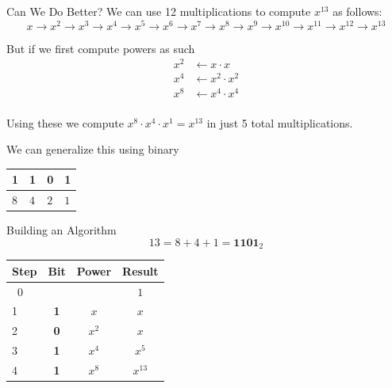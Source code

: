 \documentclass[aspectratio=169]{beamer}
\begin{document}
\begin{frame}{Can We Do Better?}
    We can use 12 multiplications to compute $x^{13}$ as follows: 
    \[
    x \to x^2 \to x^3 \to x^4 \to x^5 \to x^6 \to x^7 \to x^8 \to x^9 \to x^{10} \to x^{11} \to x^{12} \to x^{13}
    \]
    
    \pause
    
    But if we first compute powers as such
    \begin{align*}
        x^2 &\gets x \cdot x \\
        x^4 &\gets x^2 \cdot x^2 \\ 
        x^8 &\gets x^4 \cdot x^4 \\
    \end{align*}
    
    \pause
    
    Using these we compute $x^8 \cdot x^4 \cdot x^1 = x^{13}$ in just 5 total multiplications.
    
    \pause
    
    We can generalize this using binary
    \begin{table}[]
    \begin{tabular}{|l|l|l|l|}
    \hline
    \textbf{1} & \textbf{1} & \textbf{0}  & \textbf{1} \\ \hline
    $8$        & $4$        & $2$         & $1$        \\
    \hline
    \end{tabular}
    \end{table}
\end{frame}

\begin{frame}{Building an Algorithm}
    \[
        13 = 8 + 4 + 1 = \textbf{1101}_2
    \] \pause
    
    \begin{table}[]
        \centering
        \begin{tabular}{|l|c|c|c|}
        \hline
            Step & Bit        & Power & Result      \\ \hline
            \ 0   &            &      & $1$         \\ \hline\noalign{\pause}
            1    & \textbf{1} & $x$   & $x$         \\ \hline\noalign{\pause}
            2    & \textbf{0} & $x^2$ & $x$         \\ \hline\noalign{\pause}
            3    & \textbf{1} & $x^4$ & $x^5$       \\ \hline\noalign{\pause}
            4    & \textbf{1} & $x^8$ & $x^{13}$    \\ \hline
        \end{tabular}
    \end{table}
\end{frame}
\end{document}
